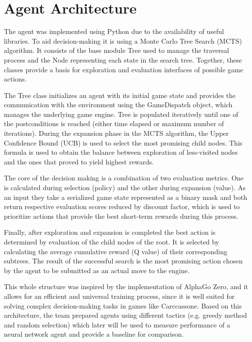 \section{Agent Architecture}

The agent was implemented using Python due to the availability of useful libraries. 
To aid decision-making it is using a Monte Carlo Tree Search (MCTS) algorithm. 
It consists of the base module Tree used to manage the traversal process and 
the Node representing each state in the search tree. Together, these classes 
provide a basis for exploration and evaluation interfaces of possible game actions.

The Tree class initializes an agent with its initial game state and provides the 
communication with the environment using the GameDispatch object, which manages 
the underlying game engine. Tree is populated iteratively until one of the 
postconditions is reached (either time elapsed or maximum number of iterations). 
During the expansion phase in the MCTS algorithm, the Upper Confidence Bound (UCB) 
is used to select the most promising child nodes. This formula is used to obtain 
the balance between exploration of less-visited nodes and the ones that proved to yield highest rewards.

The core of the decision making is a combination of two evaluation metrics. 
One is calculated during selection (policy) and the other during expansion (value). 
As an input they take a serialized game state represented as a binary mask and both 
return respective evaluation scores reduced by discount factor, which is used to 
prioritize actions that provide the best short-term rewards during this process.

Finally, after exploration and expansion is completed the best action is determined 
by evaluation of the child nodes of the root. It is selected by calculating the 
average cumulative reward (Q value) of their corresponding subtrees. 
The result of the successful search is the most promising action chosen by 
the agent to be submitted as an actual move to the engine. 

This whole structure was inspired by the implementation of AlphaGo Zero, 
and it allows for an efficient and universal training process, since 
it is well suited for solving complex decision-making tasks in games like Carccassone. 
Based on this architecture, the team prepared agents using different 
tactics (e.g. greedy method and random selection) which later will be used to 
measure performance of a neural network agent and provide a baseline for comparison.

